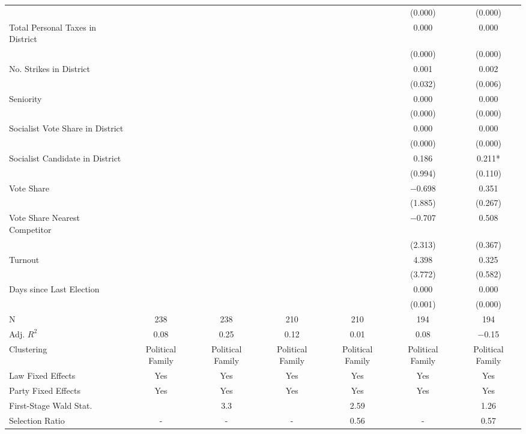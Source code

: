 \begin{table}[!h]
{\begin{threeparttable}
\begin{tabular}[t]{lcccccc}
 &  &  &  &  & (\num{0.000}) & \vphantom{3} (\num{0.000})\\
Total Personal Taxes in District &  &  &  &  & \num{0.000} & \num{0.000}\\
 &  &  &  &  & (\num{0.000}) & \vphantom{2} (\num{0.000})\\
No. Strikes in District &  &  &  &  & \num{0.001} & \num{0.002}\\
 &  &  &  &  & (\num{0.032}) & (\num{0.006})\\
Seniority &  &  &  &  & \num{0.000} & \num{0.000}\\
 &  &  &  &  & (\num{0.000}) & \vphantom{1} (\num{0.000})\\
Socialist Vote Share in District &  &  &  &  & \num{0.000} & \num{0.000}\\
 &  &  &  &  & (\num{0.000}) & (\num{0.000})\\
Socialist Candidate in District &  &  &  &  & \num{0.186} & \num{0.211}*\\
 &  &  &  &  & (\num{0.994}) & (\num{0.110})\\
Vote Share &  &  &  &  & \num{-0.698} & \num{0.351}\\
 &  &  &  &  & (\num{1.885}) & (\num{0.267})\\
Vote Share Nearest Competitor &  &  &  &  & \num{-0.707} & \num{0.508}\\
 &  &  &  &  & (\num{2.313}) & (\num{0.367})\\
Turnout &  &  &  &  & \num{4.398} & \num{0.325}\\
 &  &  &  &  & (\num{3.772}) & (\num{0.582})\\
Days since Last Election &  &  &  &  & \num{0.000} & \num{0.000}\\
 &  &  &  &  & (\num{0.001}) & (\num{0.000})\\
\midrule
N & \num{238} & \num{238} & \num{210} & \num{210} & \num{194} & \num{194}\\
Adj. $R^2$ & \num{0.08} & \num{0.25} & \num{0.12} & \num{0.01} & \num{0.08} & \num{-0.15}\\
Clustering & Political Family & Political Family & Political Family & Political Family & Political Family & Political Family\\
Law Fixed Effects & Yes & Yes & Yes & Yes & Yes & Yes\\
Party Fixed Effects & Yes & Yes & Yes & Yes & Yes & Yes\\
First-Stage Wald Stat. &  & 3.3 &  & 2.59 &  & 1.26\\
Selection Ratio & - & - & - & 0.56 & - & 0.57\\

\end{tabular}
\end{threeparttable}}
\end{table}
